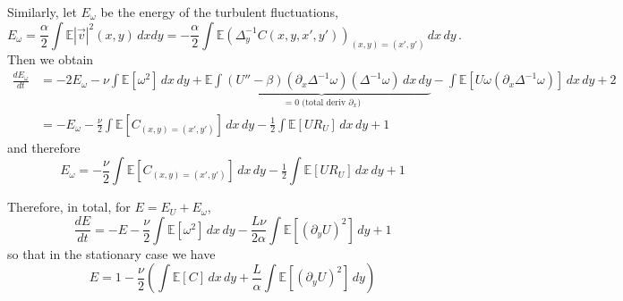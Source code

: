 \documentclass[11pt]{amsart}
\def\EE{\mathbb{E}}\def\PP{\mathbb{P}}
\begin{document}
Similarly, let $E_\omega$ be the energy of the turbulent fluctuations,
\begin{equation}
  E_\omega = \frac\alpha2\int \EE|\vec{v}|^2(x,y)\,dxdy = -\frac\alpha2\int\EE\left(\Delta_y^{-1} C(x,y,x',y')\right)_{(x,y)=(x',y')}\,dx\,dy\,.
\end{equation}
Then we obtain
\begin{align*}
  \frac{dE_\omega}{dt} &= -2E_\omega -\nu\int\EE[\omega^2]\,dx\,dy+\EE\underbrace{\int(U''-\beta)(\partial_x\Delta^{-1}\omega)(\Delta^{-1}\omega)\,dx\,dy}_{=0 \textrm{ (total deriv $\partial_x$)}}-\int\EE[U\omega (\partial_x\Delta^{-1}\omega)]\,dx\,dy+2\\
  &= -E_\omega -\frac\nu2\int\EE[C_{(x,y)=(x',y')}]\,dx\,dy-\tfrac12 \int\EE[U R_U]\,dx\,dy+1
\end{align*}
and therefore
\begin{equation}
  E_\omega= -\frac\nu2\int\EE[C_{(x,y)=(x',y')}]\,dx\,dy-\tfrac12 \int\EE[U R_U]\,dx\,dy+1
\end{equation}

Therefore, in total, for $E=E_U + E_\omega$,
\begin{equation}
  \frac{dE}{dt} = -E -\frac\nu2\int\EE[\omega^2]\,dx\,dy - \frac{L\nu}{2\alpha} \int\EE[(\partial_y U)^2]\,dy + 1
\end{equation}
so that in the stationary case we have
\begin{equation}
  E = 1 - \frac\nu2 \left(\int\EE[C]\,dx\,dy + \frac{L}{\alpha} \int\EE[(\partial_y U)^2]\,dy\right)
\end{equation}


 

\end{document}
